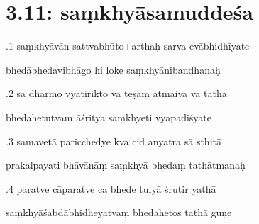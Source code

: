 \documentclass[article,12pt,a4paper]{memoir}%
\newcounter{parCount}
\begin{document}
	  
	
\chapter[{3.11: saṃkhyāsamuddeśa}][{3.11: saṃkhyāsamuddeśa}]{ 3.11: saṃkhyāsamuddeśa}

	  
	  \pstart {}.1 saṃkhyāvān sattvabhūto+arthaḥ sarva evābhidhīyate 
	{}
	\pend%
      

	  
	  \pstart \leavevmode%
	bhedābhedavibhāgo hi loke saṃkhyānibandhanaḥ 
	{}
	\pend%
      

	  
	  \pstart {}.2 sa dharmo vyatirikto vā teṣāṃ ātmaiva vā tathā 
	{}
	\pend%
      

	  
	  \pstart \leavevmode%
	bhedahetutvam āśritya saṃkhyeti vyapadiśyate 
	{}
	\pend%
      

	  
	  \pstart {}.3 samavetā paricchedye kva cid anyatra sā sthitā 
	{}
	\pend%
      

	  
	  \pstart \leavevmode%
	prakalpayati bhāvānāṃ saṃkhyā bhedaṃ tathātmanaḥ 
	{}
	\pend%
      

	  
	  \pstart {}.4 paratve cāparatve ca bhede tulyā śrutir yathā 
	{}
	\pend%
      

	  
	  \pstart \leavevmode%
	saṃkhyāśabdābhidheyatvaṃ bhedahetos tathā guṇe 
	{}
	\pend%
      
\end{document}
